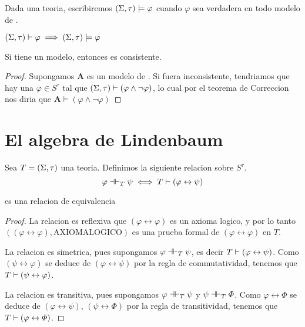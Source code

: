 \begin{definition}
  Dada \forder una teoria, escribiremos $(\Sigma,\tau)\models\varphi$ cuando $\varphi$ sea verdadera en todo modelo de \forder.
\end{definition}

\begin{theorem}
  $(\Sigma,\tau)\vdash\varphi \implies (\Sigma,\tau)\models\varphi$
\end{theorem}
\noproof
\begin{corollary}
  Si \forder tiene un modelo, entonces \forder es consistente.
\end{corollary}
\begin{proof}
  Supongamos $\mathbf{A}$ es un modelo de \forder. Si \forder fuera inconsistente, tendriamos que hay una $\varphi\in S^\tau$
  tal que $(\Sigma,\tau)\vdash(\varphi\land\neg\varphi)$, lo cual por el teorema de Correccion nos diria que $\mathbf{A}\models(\varphi\land\neg\varphi)$
\end{proof}

\section{El algebra de Lindenbaum}
\begin{definition}
  Sea $T=(\Sigma,\tau)$ una teoria. Definimos la siguiente relacion sobre $S^\tau$.
  $$
  \varphi\dashv\vdash_{T}\psi \iff T\vdash\left(\varphi\leftrightarrow\psi\right)
  $$
\end{definition}

\begin{lemma}
  \trel es una relacion de equivalencia
\end{lemma}
\begin{proof}
  La relacion es reflexiva que $(\varphi\leftrightarrow\varphi)$ es un axioma logico, y por lo tanto\\
  $((\varphi\leftrightarrow\varphi),\text{AXIOMALOGICO})$ es una prueba formal de $(\varphi\leftrightarrow\varphi)$ en $T$.
  
  La relacion es simetrica, pues supongamos $\varphi\dashv\vdash_{T}\psi$, es decir $T\vdash(\varphi\leftrightarrow\psi)$. Como 
  $(\psi\leftrightarrow\varphi)$ se deduce de $(\varphi\leftrightarrow\psi)$ por la regla de commutatividad, tenemos que $T\vdash(\psi\leftrightarrow\varphi)$.

  La relacion es transitiva, pues supongamos $\varphi\dashv\vdash_{T}\psi$ y $\psi\dashv\vdash_{T}\varPhi$. Como $\varphi\leftrightarrow\varPhi$
  se deduce de $(\varphi\leftrightarrow\psi)$, $(\psi\leftrightarrow\varPhi)$ por la regla de transitividad, tenemos que $T\vdash(\varphi\leftrightarrow\varPhi)$.
\end{proof}


